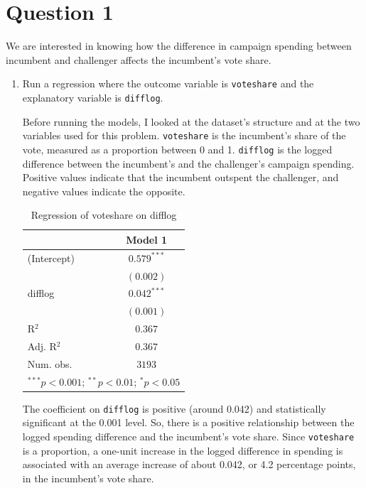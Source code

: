 \documentclass[12pt,letterpaper]{article}
\begin{document}
\section*{Question 1}
\vspace{.25cm}
\noindent We are interested in knowing how the difference in campaign spending between incumbent and challenger affects the incumbent's vote share. 
	\begin{enumerate}
		\item Run a regression where the outcome variable is \texttt{voteshare} and the explanatory variable is \texttt{difflog}.		
		
		\noindent Before running the models, I looked at the dataset's structure and at the two variables used for this problem. \texttt{voteshare} is the incumbent's share of the vote, measured as a proportion between 0 and 1. \texttt{difflog} is the logged difference between the incumbent's and the challenger's campaign spending. Positive values indicate that the incumbent outspent the challenger, and negative values indicate the opposite.
		
		
		
		\begin{table} [H]
			\begin{center}
				\begin{tabular}{l c}
					\hline
					& Model 1 \\
					\hline
					(Intercept) & $0.579^{***}$ \\
					& $(0.002)$     \\
					difflog     & $0.042^{***}$ \\
					& $(0.001)$     \\
					\hline
					R$^2$       & $0.367$       \\
					Adj. R$^2$  & $0.367$       \\
					Num. obs.   & $3193$        \\
					\hline
					\multicolumn{2}{l}{\scriptsize{$^{***}p<0.001$; $^{**}p<0.01$; $^{*}p<0.05$}}
				\end{tabular}
				\caption{Regression of voteshare on difflog}
				\label{table:model1}
			\end{center}
		\end{table}
		
		\noindent The coefficient on \texttt{difflog} is positive (around 0.042) and statistically significant at the 0.001 level. So, there is a positive relationship between the logged spending difference and the incumbent's vote share. Since \texttt{voteshare} is a proportion, a one-unit increase in the logged difference in spending is associated with an average increase of about 0.042, or 4.2 percentage points, in the incumbent's vote share. 
		

\end{enumerate}
\end{document}
